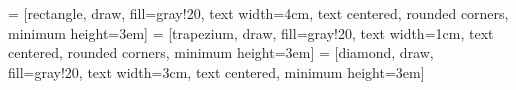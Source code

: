 
\usepackage[dvipsnames]{xcolor}

\usepackage{textcomp}

\usepackage{tikz}
\usetikzlibrary{shapes, shapes.misc, arrows, fit, positioning}
 = [rectangle, draw, fill=gray!20, text width=4cm, text centered, rounded corners, minimum height=3em]
 = [trapezium, draw, fill=gray!20, text width=1cm, text centered, rounded corners, minimum height=3em]
 = [diamond, draw, fill=gray!20, text width=3cm, text centered, minimum height=3em]

\usepackage{float}
\usepackage{booktabs}
\usepackage{pbox}
\usepackage{multirow}
\usepackage[normalem]{ulem}

\usepackage[hidelinks]{hyperref}


\def\UrlBreaks{\do\/\do-\do\ }

\renewcommand{\UrlFont}{\small\ttfamily\itshape}

\usepackage{framed}
\usepackage{enumitem}

\usepackage{listings}

\usepackage[utf8]{inputenc}
\usepackage{csquotes}
\usepackage[acronym]{glossaries}

%   
%

